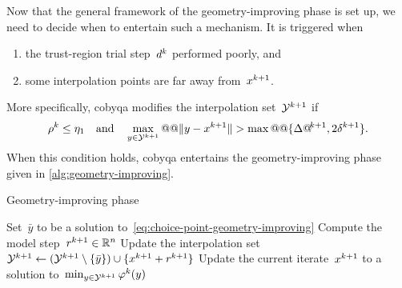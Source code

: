 Now that the general framework of the geometry-improving phase is set up, we need to decide when to entertain such a mechanism.
It is triggered when
\begin{enumerate}
    \item the trust-region trial step~$\step[k]$ performed poorly, and
    \item some interpolation points are far away from~$\iter[k + 1]$.
\end{enumerate}
More specifically, \gls{cobyqa} modifies the interpolation set~$\xpt[k + 1]$ if
\begin{equation*}
    \ratio[k] \le \eta_1 \quad \text{and} \quad \max_{y \in \xpt[k + 1]} @@ \norm{y - \iter[k + 1]} > \max @@ \set{\rad[k + 1], 2 \radlb[k + 1]}.
\end{equation*}
When this condition holds, \gls{cobyqa} entertains the geometry-improving phase given in \cref{alg:geometry-improving}.

\begin{algorithm}
    \caption{Geometry-improving phase}
    \label{alg:geometry-improving}
    \DontPrintSemicolon
    \onehalfspacing
    Set~$\bar{y}$ to be a solution to~\cref{eq:choice-point-geometry-improving}\;
    Compute the model step~$\rstep[k + 1] \in \R^n$\;
    Update the interpolation set~$\xpt[k + 1] \gets (\xpt[k + 1] \setminus \set{\bar{y}}) \cup \set{\iter[k + 1] + \rstep[k + 1]}$\;
    Update the current iterate~$\iter[k + 1]$ to a solution to~$\min_{y \in \xpt[k + 1]} \merit[k](y)$ \label{alg:geometry-improving-iterate}\;
\end{algorithm}

